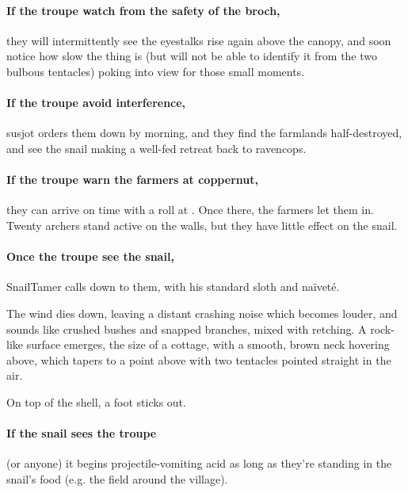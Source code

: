 
\paragraph{If the troupe watch from the safety of the \gls{broch},}
they will intermittently see the eyestalks rise again above the canopy, and soon notice how slow the thing is (but will not be able to identify it from the two bulbous tentacles) poking into view for those small moments.

\paragraph{If the troupe avoid interference,}
\gls{susjot} orders them down by morning, and they find the farmlands half-destroyed, and see the snail making a well-fed retreat back to \gls{ravencops}.

\paragraph{If the troupe warn the farmers at \gls{coppernut},}
they can arrive on time with a  roll at \tn[5].
Once there, the farmers let them in.
Twenty archers stand active on the walls, but they have little effect on the snail.

\paragraph{Once the troupe see the snail,}
\gls{SnailTamer} calls down to them, with his standard sloth and na\"ivet\'e.

\begin{boxtext}
  The wind dies down, leaving a distant crashing noise which becomes louder, and sounds like crushed bushes and snapped branches, mixed with  retching.
  A rock-like surface emerges, the size of a cottage, with a smooth, brown neck hovering above, which tapers to a point above with two tentacles pointed straight in the air.

  On top of the shell, a foot sticks out.
\end{boxtext}

\SnailTamer

\paragraph{If the snail sees the troupe}
(or anyone) it begins projectile-vomiting acid as long as they're standing in the snail's food (e.g. the field around the \gls{village}).

